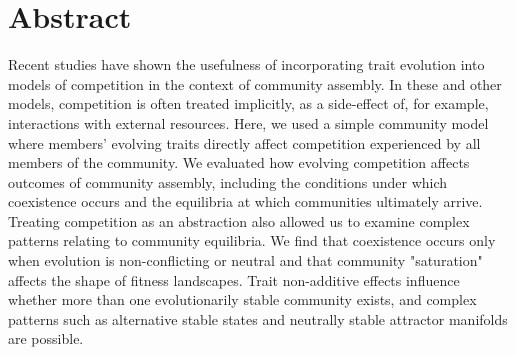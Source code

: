 \section*{Abstract}


Recent studies have shown the usefulness of incorporating trait evolution into models
of competition in the context of community assembly.
In these and other models, competition is often treated implicitly, as a side-effect of,
for example, interactions with external resources.
Here, we used a simple community model where members' evolving traits directly affect
competition experienced by all members of the community.
We evaluated how evolving competition affects outcomes of community assembly,
including the conditions under which coexistence occurs and the equilibria at
which communities ultimately arrive.
Treating competition as an abstraction also allowed us to examine complex
patterns relating to community equilibria.
We find that coexistence occurs only when evolution is non-conflicting or neutral
and that community "saturation" affects the shape of fitness landscapes.
Trait non-additive effects influence whether more than one evolutionarily
stable community exists, and complex patterns such as alternative stable
states and neutrally stable attractor manifolds are possible.

